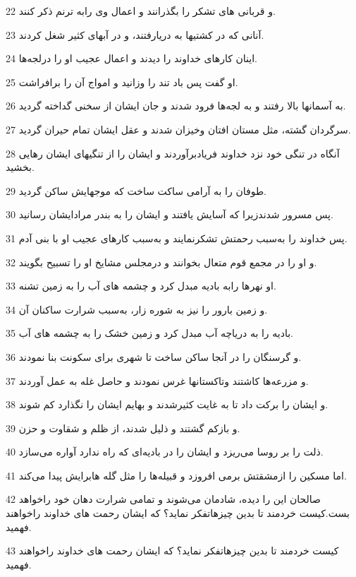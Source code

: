 \par 22 و قربانی های تشکر را بگذرانند و اعمال وی رابه ترنم ذکر کنند.
\par 23 آنانی که در کشتیها به دریارفتند، و در آبهای کثیر شغل کردند.
\par 24 اینان کارهای خداوند را دیدند و اعمال عجیب او را درلجه‌ها.
\par 25 او گفت پس باد تند را وزانید و امواج آن را برافراشت.
\par 26 به آسمانها بالا رفتند و به لجه‌ها فرود شدند و جان ایشان از سخنی گداخته گردید.
\par 27 سرگردان گشته، مثل مستان افتان وخیزان شدند و عقل ایشان تمام حیران گردید.
\par 28 آنگاه در تنگی خود نزد خداوند فریادبرآوردند و ایشان را از تنگیهای ایشان رهایی بخشید.
\par 29 طوفان را به آرامی ساکت ساخت که موجهایش ساکن گردید.
\par 30 پس مسرور شدندزیرا که آسایش یافتند و ایشان را به بندر مرادایشان رسانید.
\par 31 پس خداوند را به‌سبب رحمتش تشکرنمایند و به‌سبب کارهای عجیب او با بنی آدم.
\par 32 و او را در مجمع قوم متعال بخوانند و درمجلس مشایخ او را تسبیح بگویند.
\par 33 او نهرها رابه بادیه مبدل کرد و چشمه های آب را به زمین تشنه.
\par 34 و زمین بارور را نیز به شوره زار، به‌سبب شرارت ساکنان آن.
\par 35 بادیه را به دریاچه آب مبدل کرد و زمین خشک را به چشمه های آب.
\par 36 و گرسنگان را در آنجا ساکن ساخت تا شهری برای سکونت بنا نمودند.
\par 37 و مزرعه‌ها کاشتند وتاکستانها غرس نمودند و حاصل غله به عمل آوردند.
\par 38 و ایشان را برکت داد تا به غایت کثیرشدند و بهایم ایشان را نگذارد کم شوند.
\par 39 و بازکم گشتند و ذلیل شدند، از ظلم و شقاوت و حزن.
\par 40 ذلت را بر روسا می‌ریزد و ایشان را در بادیه‌ای که راه ندارد آواره می‌سازد.
\par 41 اما مسکین را ازمشقتش برمی افروزد و قبیله‌ها را مثل گله هابرایش پیدا می‌کند.
\par 42 صالحان این را دیده، شادمان می‌شوند و تمامی شرارت دهان خود راخواهد بست.کیست خردمند تا بدین چیزهاتفکر نماید؟ که ایشان رحمت های خداوند راخواهند فهمید.
\par 43 کیست خردمند تا بدین چیزهاتفکر نماید؟ که ایشان رحمت های خداوند راخواهند فهمید.
 
